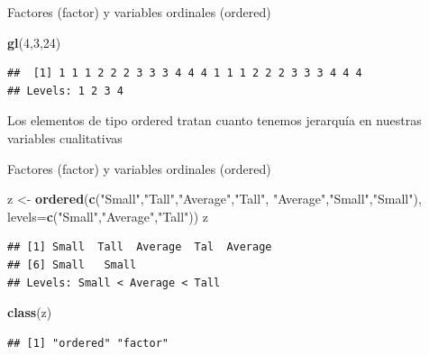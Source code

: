 \documentclass[ignorenonframetext,]{beamer}
\newenvironment{Shaded}{\begin{snugshade}}{\end{snugshade}}
\newcommand{\KeywordTok}[1]{\textcolor[rgb]{0.13,0.29,0.53}{\textbf{#1}}}
\newcommand{\DataTypeTok}[1]{\textcolor[rgb]{0.13,0.29,0.53}{#1}}
\newcommand{\DecValTok}[1]{\textcolor[rgb]{0.00,0.00,0.81}{#1}}
\newcommand{\StringTok}[1]{\textcolor[rgb]{0.31,0.60,0.02}{#1}}
\newcommand{\NormalTok}[1]{#1}
\begin{document}
\begin{frame}[fragile]{Factores (factor) y variables ordinales
(ordered)}

\begin{Shaded}
\begin{Highlighting}[]
\KeywordTok{gl}\NormalTok{(}\DecValTok{4}\NormalTok{,}\DecValTok{3}\NormalTok{,}\DecValTok{24}\NormalTok{)}
\end{Highlighting}
\end{Shaded}

\begin{verbatim}
##  [1] 1 1 1 2 2 2 3 3 3 4 4 4 1 1 1 2 2 2 3 3 3 4 4 4
## Levels: 1 2 3 4
\end{verbatim}

Los elementos de tipo ordered tratan cuanto tenemos jerarquía en
nuestras variables cualitativas

\end{frame}

\begin{frame}[fragile]{Factores (factor) y variables ordinales
(ordered)}

\begin{Shaded}
\begin{Highlighting}[]
\NormalTok{z <-}\StringTok{ }\KeywordTok{ordered}\NormalTok{(}\KeywordTok{c}\NormalTok{(}\StringTok{"Small"}\NormalTok{,}\StringTok{"Tall"}\NormalTok{,}\StringTok{"Average"}\NormalTok{,}\StringTok{"Tall"}\NormalTok{,}
               \StringTok{"Average"}\NormalTok{,}\StringTok{"Small"}\NormalTok{,}\StringTok{"Small"}\NormalTok{),}
             \DataTypeTok{levels=}\KeywordTok{c}\NormalTok{(}\StringTok{"Small"}\NormalTok{,}\StringTok{"Average"}\NormalTok{,}\StringTok{"Tall"}\NormalTok{))}
\NormalTok{z}
\end{Highlighting}
\end{Shaded}

\begin{verbatim}
## [1] Small  Tall  Average  Tal  Average 
## [6] Small   Small  
## Levels: Small < Average < Tall
\end{verbatim}

\begin{Shaded}
\begin{Highlighting}[]
\KeywordTok{class}\NormalTok{(z)}
\end{Highlighting}
\end{Shaded}

\begin{verbatim}
## [1] "ordered" "factor"
\end{verbatim}

\end{frame}
\end{document}
